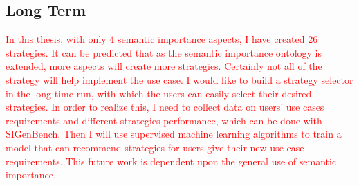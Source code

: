 \subsection{Long Term}
\textcolor{red}{
In this thesis, with only 4 semantic importance aspects, I have created 26 strategies.
It can be predicted that as the semantic importance ontology is extended, more aspects will create more strategies. 
Certainly not all of the strategy will help implement the use case. 
I would like to build a strategy selector in the long time run, with which the users can easily select their desired strategies. 
In order to realize this, I need to collect data on users' use cases requirements and different strategies performance, which can be done with SIGenBench.
Then I will use supervised machine learning algorithms to train a model that can recommend strategies for users give their new use case requirements. 
This future work is dependent upon the general use of semantic importance. 
}


